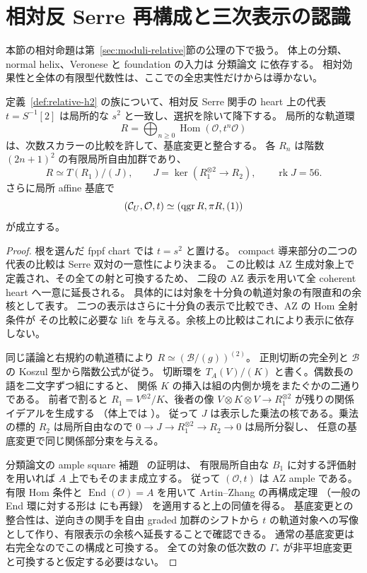 \section{相対反 Serre 再構成と三次表示の認識}
\label{sec:moduli-antiserre-recognition}

本節の相対命題は第~\ref{sec:moduli-relative}節の公理の下で扱う。
体上の分類、normal helix、Veronese と foundation の入力は
分類論文 \cite{QuadricIntrinsic2026} に依存する。
相対効果性と全体の有限型代数性は、ここでの全忠実性だけからは導かない。

\begin{proposition}
\label{prop:relative-h2-antiserre-reconstruction}
定義~\ref{def:relative-h2} の族について、相対反 Serre 関手の heart 上の代表
$t=S^{-1}[2]$ は局所的な $s^2$ と一致し、選択を除いて降下する。
局所的な軌道環
\[
 R=\bigoplus_{n\ge0}\operatorname{Hom}(\mathcal O,t^n\mathcal O)
\]
は、次数スカラーの比較を許して、基底変更と整合する。
各 $R_n$ は階数 $(2n+1)^2$ の有限局所自由加群であり、
\[
 R\simeq T(R_1)/(J),\qquad
 J=\ker(R_1^{\otimes2}\to R_2),\qquad\operatorname{rk}J=56.
\]
さらに局所 affine 基底で
\[
 (\mathcal C_U,\mathcal O,t)\simeq(\operatorname{qgr} R,\pi R,(1))
\]
が成立する。
\end{proposition}
\begin{proof}
根を選んだ fppf chart では $t=s^2$ と置ける。
compact 導来部分の二つの代表の比較は Serre 双対の一意性により決まる。
この比較は AZ 生成対象上で定義され、その全ての射と可換するため、
二段の AZ 表示を用いて全 coherent heart へ一意に延長される。
具体的には対象を十分負の軌道対象の有限直和の余核として表す。
二つの表示はさらに十分負の表示で比較でき、AZ の Hom 全射条件が
その比較に必要な lift を与える。余核上の比較はこれにより表示に依存しない。

同じ議論と右規約の軌道積により
$R\simeq(\mathcal B/(g))^{(2)}$。
正則切断の完全列と $\mathcal B$ の Koszul 型から階数公式が従う。
切断環を $T_A(V)/(K)$ と書く。偶数長の語を二文字ずつ組にすると、
関係 $K$ の挿入は組の内側か境をまたぐかの二通りである。
前者で割ると $R_1=V^{\otimes2}/K$、後者の像
$V\otimes K\otimes V\to R_1^{\otimes2}$ が残りの関係イデアルを生成する
（体上では \cite[\texttt{prop:antiserre-quadratic}]{QuadricIntrinsic2026}）。
従って $J$ は表示した乗法の核である。乗法の標的 $R_2$ は局所自由なので
$0\to J\to R_1^{\otimes2}\to R_2\to0$ は局所分裂し、
任意の基底変更で同じ関係部分束を与える。

分類論文の ample square 補題~\cite[ample square の補題]{QuadricIntrinsic2026} の証明は、
有限局所自由な $B_1$ に対する評価射を用いれば $A$ 上でもそのまま成立する。
従って $(\mathcal O,t)$ は AZ ample である。
有限 Hom 条件と $\operatorname{End}(\mathcal O)=A$ を用いて
Artin--Zhang の再構成定理
\cite[Theorem 4.5(1)]{AZ1994}
（一般の End 環に対する形は \cite[Theorem 7.3]{OACU2026} にも再録）
を適用すると上の同値を得る。
基底変更との整合性は、逆向きの関手を自由 graded 加群のシフトから
$t$ の軌道対象への写像として作り、有限表示の余核へ延長することで確認できる。
通常の基底変更は右完全なのでこの構成と可換する。
全ての対象の低次数の $\Gamma_*$ が非平坦底変更と可換すると仮定する必要はない。
\end{proof}

